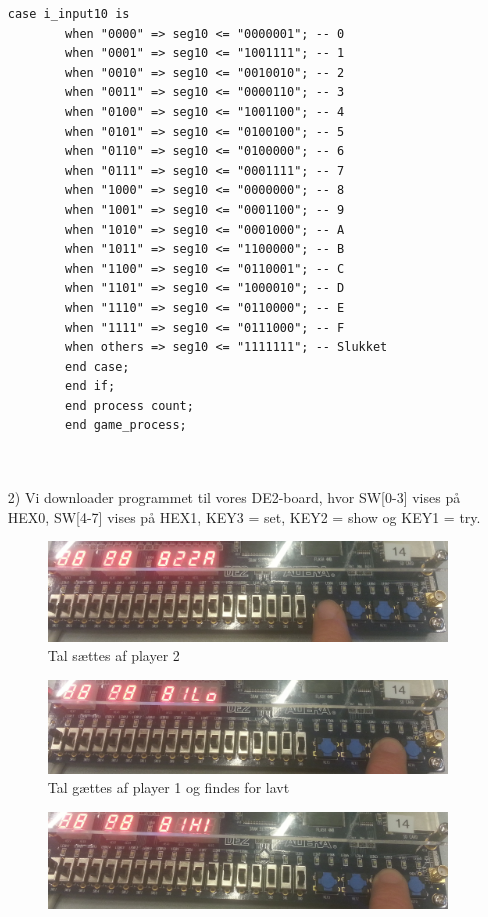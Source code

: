 \begin{enumerate}
\begin{lstlisting}[caption={Behavioral style kode for Guessgame},label={lst:Guessgame}]
		case i_input10 is
		when "0000" => seg10 <= "0000001"; -- 0
		when "0001" => seg10 <= "1001111"; -- 1
		when "0010" => seg10 <= "0010010"; -- 2
		when "0011" => seg10 <= "0000110"; -- 3
		when "0100" => seg10 <= "1001100"; -- 4
		when "0101" => seg10 <= "0100100"; -- 5
		when "0110" => seg10 <= "0100000"; -- 6
		when "0111" => seg10 <= "0001111"; -- 7
		when "1000" => seg10 <= "0000000"; -- 8
		when "1001" => seg10 <= "0001100"; -- 9
		when "1010" => seg10 <= "0001000"; -- A
		when "1011" => seg10 <= "1100000"; -- B
		when "1100" => seg10 <= "0110001"; -- C
		when "1101" => seg10 <= "1000010"; -- D
		when "1110" => seg10 <= "0110000"; -- E
		when "1111" => seg10 <= "0111000"; -- F
		when others => seg10 <= "1111111"; -- Slukket
		end case;
		end if;
		end process count;
		end game_process;
		
		
		\end{lstlisting}
		\item[2)]
		Vi downloader programmet til vores DE2-board, hvor SW[0-3] vises på HEX0, SW[4-7] vises på HEX1, KEY3 = set, KEY2 = show og KEY1 = try. \\
		\begin{figure}[h]
			\centering
			\includegraphics[scale=0.15]{pictures/Oevelse5/opg3/guess_2p_set.JPG}
			\caption{Tal sættes af player 2}
			\label{fig:Guess2pSet}
		\end{figure}
		\begin{figure}[h]
			\centering
			\includegraphics[scale=0.15]{pictures/Oevelse5/opg3/guess_2p_try_lo.JPG}
			\caption{Tal gættes af player 1 og findes for lavt}
			\label{fig:Guess2pTryLo}
		\end{figure}
		\begin{figure}[h]
			\centering
			\includegraphics[scale=0.15]{pictures/Oevelse5/opg3/guess_2p_try_hi.JPG}

\end{figure}
\end{enumerate}
